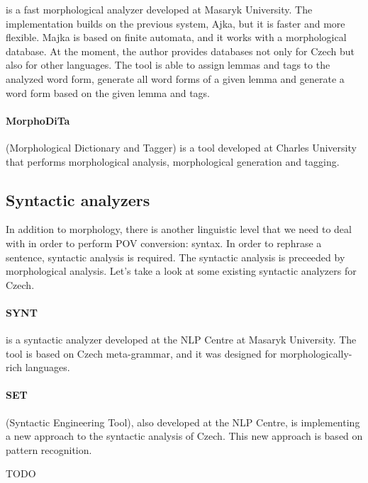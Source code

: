 is a fast morphological analyzer developed at Masaryk University. The implementation builds on the previous system, Ajka, but it is faster and more flexible. Majka is based on finite automata, and it works with a morphological database. At the moment, the author provides databases not only for Czech but also for other languages. The tool is able to assign lemmas and tags to the analyzed word form, generate all word forms of a given lemma and generate a word form based on the given lemma and tags. \cite{majka}

\paragraph{MorphoDiTa} (Morphological Dictionary and Tagger) is a tool developed at Charles University that performs morphological analysis, morphological generation and tagging. \cite{strakova14}

\subsection{Syntactic analyzers}
\label{sec:synt-an}

In addition to morphology, there is another linguistic level that we need to deal with in order to perform POV conversion: syntax. In order to rephrase a sentence, syntactic analysis is required. The syntactic analysis is preceeded by morphological analysis. Let's take a look at some existing syntactic analyzers for Czech.

\paragraph{SYNT} is a syntactic analyzer developed at the NLP Centre at Masaryk University. The tool is based on Czech meta-grammar, and it was designed for morphologically-rich languages.

\paragraph{SET} (Syntactic Engineering Tool), also developed at the NLP Centre, is implementing a new approach to the syntactic analysis of Czech. This new approach is based on pattern recognition. \cite{set}

TODO
